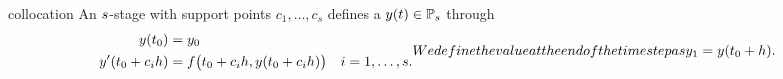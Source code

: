 \begin{Definition}{collocation}
  An $s$-stage  with support points
  $c_1,\ldots,c_s$ defines a  $y(t)\in
  \mathbb P_s$ through
  \begin{subequations}
    \label{eq:implicit:13}
    \begin{align}
      \label{eq:implicit:2}
      y(t_0) &= y_0 \\
      \label{eq:implicit:12}
      y'(t_0+\rkc_i h) &= f\bigl(t_0+\rkc_i h, y(t_0+\rkc_i h)\bigr)
      \quad i=1,\dots,s.
    \end{align}
    We define the value at the end of the time step as
    \begin{gather}
      y_1 = y(t_0+h).
    \end{gather}
  \end{subequations}
\end{Definition}

